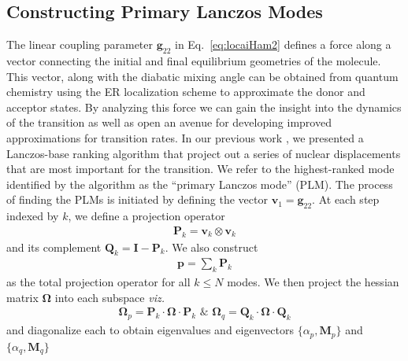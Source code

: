 





\subsection{Constructing Primary Lanczos Modes}
The linear coupling parameter $ {\mathbf g}_{22}$ in Eq.~\ref{eq:locaiHam2} defines
a force
along a vector connecting
the initial and final equilibrium geometries of the molecule.
This vector, along with the diabatic mixing angle can be obtained from quantum chemistry
using the ER localization
scheme to approximate the donor and acceptor states.
By analyzing this force we can gain the insight into the dynamics of the transition as well as
open an avenue for developing improved approximations for transition rates.
In our previous work \cite{yang2014intramolecular},  we presented a Lanczos-base ranking algorithm that project
out a series of nuclear displacements that are most important for
the transition.   We refer to the highest-ranked mode identified by the algorithm
as the ``primary Lanczos mode'' (PLM).
The process of finding the PLMs is initiated by defining the vector ${\mathbf v}_{1} = {\mathbf g}_{22}$.
At each step indexed by $k$,  we define a projection operator
\begin{eqnarray}
{\mathbf P}_{k} = {\mathbf v}_{k}\otimes  {\mathbf v}_{k}
\end{eqnarray}
and its complement ${\mathbf Q}_{k} = {\mathbf I}  - {\mathbf P}_{k}$.
We also construct
\begin{eqnarray}
\mathbf p = \sum_{k} \mathbf P_{k}
\end{eqnarray}
as  the total projection operator for all ${k} \le N$ modes.
We then project the hessian matrix $\mathbf\Omega$ into each subspace {\em viz.}
\begin{eqnarray}
\mathbf\Omega_{p} = \mathbf P_{k}\cdot \mathbf\Omega \cdot \mathbf P_{k} \,\, \& \,\, \mathbf\Omega_{q} = \mathbf Q_{k}\cdot \mathbf\Omega \cdot  \mathbf Q_{k}
\end{eqnarray}
and diagonalize each to obtain eigenvalues and eigenvectors $\{\alpha_{p}, {\mathbf M}_{p}\}$ and $\{\alpha_{q}, {\mathbf M}_{q}\}$
